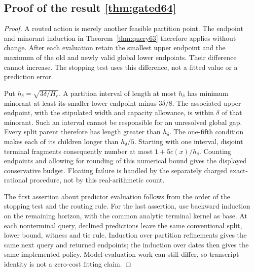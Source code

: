 \subsection{Proof of the result \ref{thm:gated64}}\label{supp:proof-gated64-1}
\begin{proof}
A routed action is merely another feasible partition point. The endpoint and minorant induction in Theorem~\ref{thm:query63} therefore applies without change. After each evaluation retain the smallest upper endpoint and the maximum of the old and newly valid global lower endpoints. Their difference cannot increase. The stopping test uses this difference, not a fitted value or a prediction error.

Put $h_\delta=\sqrt{3\delta/H_r}$. A partition interval of length at most $h_\delta$ has minimum minorant at least its smaller lower endpoint minus $3\delta/8$. The associated upper endpoint, with the stipulated width and capacity allowance, is within $\delta$ of that minorant. Such an interval cannot be responsible for an unresolved global gap. Every split parent therefore has length greater than $h_\delta$. The one-fifth condition makes each of its children longer than $h_\delta/5$. Starting with one interval, disjoint terminal fragments consequently number at most $1+5c(x)/h_\delta$. Counting endpoints and allowing for rounding of this numerical bound gives the displayed conservative budget. Floating failure is handled by the separately charged exact-rational procedure, not by this real-arithmetic count.

The first assertion about predictor evaluation follows from the order of the stopping test and the routing rule. For the last assertion, use backward induction on the remaining horizon, with the common analytic terminal kernel as base. At each nonterminal query, declined predictions leave the same conventional split, lower bound, witness and tie rule. Induction over partition refinements gives the same next query and returned endpoints; the induction over dates then gives the same implemented policy. Model-evaluation work can still differ, so transcript identity is not a zero-cost fitting claim.
\end{proof}

